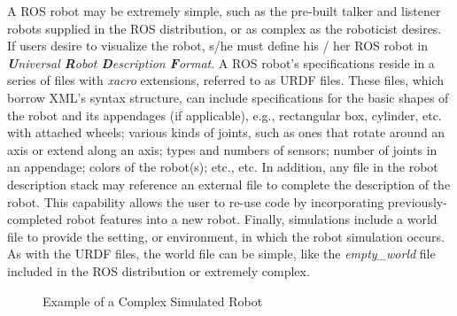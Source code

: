 \documentclass[9pt,twocolumn,twoside]{../../styles/osajnl}
\begin{document}
A ROS robot may be extremely simple, such as the pre-built talker and listener robots supplied in the ROS distribution, or as complex as the roboticist desires.  If users desire to visualize the robot, s/he must define his / her ROS robot in \textit{\textbf{U}niversal \textbf{R}obot \textbf{D}escription \textbf{F}ormat}.  A ROS robot's specifications reside in a series of files with \textit{xacro} extensions, referred to as URDF files.  These files, which borrow XML's syntax structure, can include specifications for the basic shapes of the robot and its appendages (if applicable), e.g., rectangular box, cylinder, etc. with attached wheels; various kinds of joints, such as ones that rotate around an axis or extend along an axis; types and numbers of sensors; number of joints in an appendage; colors of the robot(s); etc., etc.  In addition, any file in the robot description stack may reference an external file to complete the description of the robot.  This capability allows the user to re-use code by incorporating previously-completed robot features into a new robot.  Finally, simulations include a world file to provide the setting, or environment, in which the robot simulation occurs.  As with the URDF files, the world file can be simple, like the \textit{empty\_world} file included in the ROS distribution or extremely complex.  

\begin{figure}[htbp]
\centering
{}
\caption{Example of a Complex Simulated Robot}
\label{fig:complexRobot}
\end{figure}
\end{document}
